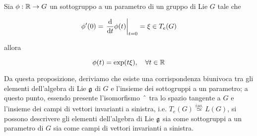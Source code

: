 \begin{definition}
	Sia $ \phi : \mathbb{R} \to G $ un sottogruppo a un parametro di un gruppo di Lie $ G $ tale che
	
	\begin{equation}
		\phi'(0) = \eval{ \dv{t} \phi(t) }_{t=0} %
		= \xi \in T_{e}(G)
	\end{equation}
	
	allora
	
	\begin{equation}
		\phi(t) = \exp (t \xi) \qcomma \forall t \in \R
	\end{equation}
\end{definition}

\begin{remark}
	Da questa proposizione, deriviamo che esiste una corrispondenza biunivoca tra gli elementi dell'algebra di Lie $ \mathfrak{g} $ di $ G $ e l'insieme dei sottogruppi a un parametro; a questo punto, essendo presente l'isomorfismo $ \; \hat{} \; $ tra lo spazio tangente a $ G $ e l'insieme dei campi di vettori invarianti a sinistra, i.e. $ T_{e}(G) \stackrel{iso.}{\simeq} L(G) $, si possono descrivere gli elementi dell'algebra di Lie $ \mathfrak{g} $ sia come sottogruppi a un parametro di $ G $ sia come campi di vettori invarianti a sinistra.
\end{remark}

